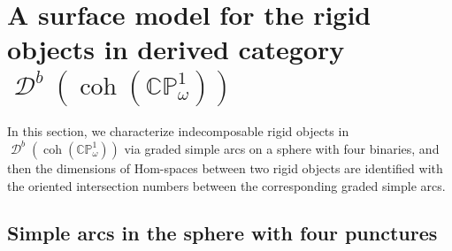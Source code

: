 \documentclass[11pt,a4paper,reqno]{amsart}%
\theoremstyle{plain}
\theoremstyle{definition}
\numberwithin{equation}{section}
\numberwithin{equation}{section}
\newcommand{\D}{\operatorname{\mathcal{D}}}
\def\wt{\omega}
\def\coh{\operatorname{coh}}
\def\coh{\operatorname{coh}}
\def\CPone{\mathbb{CP}^1_{\wt}}
\newcommand\DC[1]{\D^b(\coh(#1))}
\begin{document}
\section{A surface model  for the rigid  objects in derived category $\DC{\CPone}$}\label{sec:4}


 In this section, we  characterize indecomposable  rigid  objects in $\DC{\CPone}$ via graded simple arcs on a sphere with four binaries, and then
  the dimensions of Hom-spaces between two
 rigid  objects are identified with 
 the oriented intersection numbers between the corresponding  graded simple arcs.%
  
 
 
 
\subsection{Simple arcs in the sphere with four punctures} 
\end{document}
